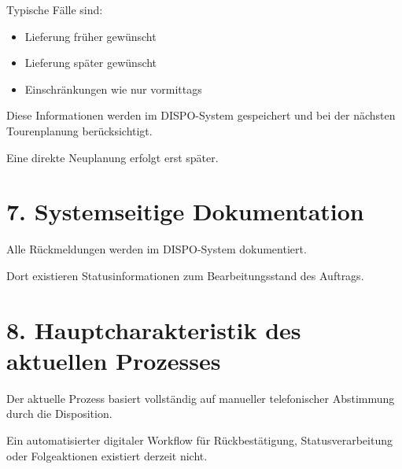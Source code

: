 \documentclass[a4paper,11pt]{article}
\begin{document}
	Typische Fälle sind:
	
	\begin{itemize}[leftmargin=1.2cm]
		\item Lieferung früher gewünscht
		\item Lieferung später gewünscht
		\item Einschränkungen wie nur vormittags
	\end{itemize}
	
	Diese Informationen werden im DISPO-System gespeichert und bei der nächsten Tourenplanung berücksichtigt.
	
	Eine direkte Neuplanung erfolgt erst später.
	
	\section*{7. Systemseitige Dokumentation}
	
	Alle Rückmeldungen werden im DISPO-System dokumentiert.
	
	Dort existieren Statusinformationen zum Bearbeitungsstand des Auftrags.
	
	\section*{8. Hauptcharakteristik des aktuellen Prozesses}
	
	Der aktuelle Prozess basiert vollständig auf manueller telefonischer Abstimmung durch die Disposition.
	
	Ein automatisierter digitaler Workflow für Rückbestätigung, Statusverarbeitung oder Folgeaktionen existiert derzeit nicht.
\end{document}

